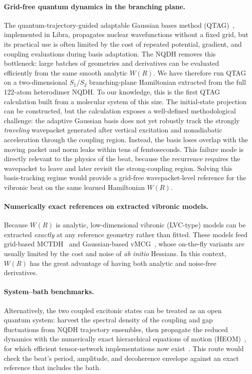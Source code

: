 \documentclass[11pt]{article}
\begin{document}
\paragraph{Grid-free quantum dynamics in the branching plane.}
The quantum-trajectory-guided adaptable Gaussian bases method (QTAG)~\cite{dutra2019quantum}, implemented in Libra, propagates nuclear wavefunctions without a fixed grid, but its practical use is often limited by the cost of repeated potential, gradient, and coupling evaluations during basis adaptation. The NQDH removes this bottleneck: large batches of geometries and derivatives can be evaluated efficiently from the same smooth analytic $W(R)$. We have therefore run QTAG on a two-dimensional $S_1/S_2$ branching-plane Hamiltonian extracted from the full 122-atom heterodimer NQDH. To our knowledge, this is the first QTAG calculation built from a molecular system of this size. The initial-state projection can be constructed, but the calculation exposes a well-defined methodological challenge: the adaptive Gaussian basis does not yet robustly track the strongly \emph{traveling} wavepacket generated after vertical excitation and nonadiabatic acceleration through the coupling region. Instead, the basis loses overlap with the moving packet and norm leaks within tens of femtoseconds. This failure mode is directly relevant to the physics of the beat, because the recurrence requires the wavepacket to leave and later revisit the strong-coupling region. Solving this basis-tracking regime would provide a grid-free wavepacket-level reference for the vibronic beat on the same learned Hamiltonian $W(R)$.

\paragraph{Numerically exact references on extracted vibronic models.}
Because $W(R)$ is analytic, low-dimensional vibronic (LVC-type) models can be extracted \emph{exactly} at any reference geometry rather than fitted. These models feed grid-based MCTDH~\cite{beck2000multiconfiguration} and Gaussian-based vMCG~\cite{richings2015quantum}, whose on-the-fly variants are usually limited by the cost and noise of \emph{ab initio} Hessians. In this context, $W(R)$ has the great advantage of having both analytic and noise-free derivatives. 

\paragraph{System--bath benchmarks.}
Alternatively, the two coupled excitonic states can be treated as an open quantum system: harvest the spectral density of the coupling and gap fluctuations from NQDH trajectory ensembles, then propagate the reduced dynamics with the numerically exact hierarchical equations of motion (HEOM)~\cite{tanimura2020numerically}, for which efficient tensor-network implementations now exist~\cite{rodriguez2026tenso}. This route would check the beat's period, amplitude, and decoherence envelope against an exact reference that includes the bath.
\end{document}
